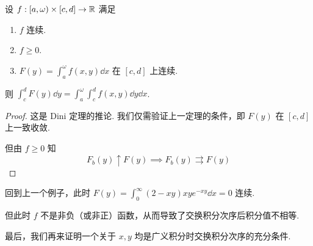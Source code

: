 \begin{property}
    设 $f:[a,\omega)\times [c,d]\to\mathbb{R}$ 满足

    \begin{enumerate}
        \item $f$ 连续.
        
        \item $f\ge 0$.
        
        \item $F(y)=\displaystyle\int_a^\omega f(x,y)\dd x$ 在 $[c,d]$ 上连续.
    \end{enumerate}

    则 $\displaystyle\int_c^dF(y)\dd y=\int_a^\omega\int_c^d f(x,y)\dd y\dd x$.
\end{property}
\begin{proof}
    这是 Dini 定理的推论. 我们仅需验证上一定理的条件，即 $F(y)$ 在 $[c,d]$ 上一致收敛.
    
    但由 $f\ge 0$ 知
$$
F_b(y)\uparrow F(y)\implies F_b(y)\rightrightarrows F(y)
$$
\end{proof}

\begin{hint}
    回到上一个例子，此时 $F(y)=\displaystyle\int_0^\infty (2-xy)xy e^{-xy}\dd x=0$ 连续.

    但此时 $f$ 不是非负（或非正）函数，从而导致了交换积分次序后积分值不相等.
\end{hint}

最后，我们再来证明一个关于 $x,y$ 均是广义积分时交换积分次序的充分条件.

